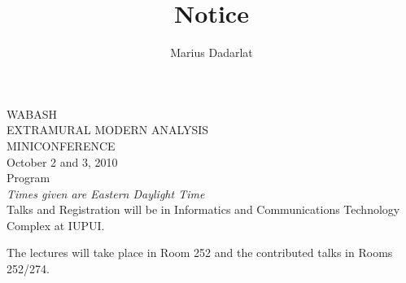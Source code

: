 \documentclass[10pt]{article}                                  %
\title{Notice}                                               %
\author{Marius Dadarlat}                                          %
\begin{document}
\vspace{2ex}
\begin{center}
{\TitleFont WABASH}\\
\smallskip
{\SubTitleFont EXTRAMURAL MODERN ANALYSIS}\\
\smallskip
{\TitleFont MINICONFERENCE}\\
\vspace{.2in}
 {\DateFont   October 2 and 3, 2010}\\
\vspace{.2in}
{\TitleFont Program}\\[.2in]

{\em Times given are Eastern Daylight Time}\\[.3in]


Talks and Registration will be in Informatics and Communications Technology Complex at IUPUI.

 The
lectures will take place in Room 252 and the contributed talks in Rooms 252/274.
\end{center} \smallskip
\end{document}
